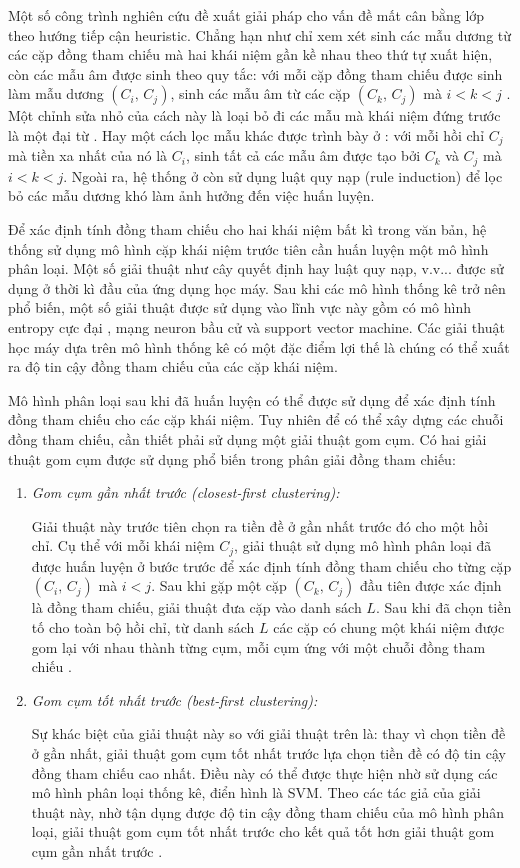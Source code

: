 Một số công trình nghiên cứu đề xuất giải pháp cho vấn đề mất cân bằng lớp theo hướng tiếp cận heuristic. Chẳng hạn như chỉ xem xét sinh các mẫu dương từ các cặp đồng tham chiếu mà hai khái niệm gần kề nhau theo thứ tự xuất hiện, còn các mẫu âm được sinh theo quy tắc: với mỗi cặp đồng tham chiếu được sinh làm mẫu dương $(C_i,\,C_j)$, sinh các mẫu âm từ các cặp $(C_k,\,C_j)$ mà $i<k<j$ \cite{Soon2001}. Một chỉnh sửa nhỏ của cách này là loại bỏ đi các mẫu mà khái niệm đứng trước là một đại từ \cite{VincentNg2002a}. Hay một cách lọc mẫu khác được trình bày ở \cite{VincentNg2002b}: với mỗi hồi chỉ $C_j$ mà tiền xa nhất của nó là $C_i$, sinh tất cả các mẫu âm được tạo bởi $C_k$ và $C_j$ mà $i<k<j$. Ngoài ra, hệ thống ở \cite{VincentNg2002b} còn sử dụng luật quy nạp (rule induction) để lọc bỏ các mẫu dương khó làm ảnh hưởng đến việc huấn luyện.

Để xác định tính đồng tham chiếu cho hai khái niệm bất kì trong văn bản, hệ thống sử dụng mô hình cặp khái niệm trước tiên cần huấn luyện một mô hình phân loại. Một số giải thuật như cây quyết định hay luật quy nạp, v.v... được sử dụng ở thời kì đầu của ứng dụng học máy. Sau khi các mô hình thống kê trở nên phổ biến, một số giải thuật được sử dụng vào lĩnh vực này gồm có mô hình entropy cực đại \cite{Berger1996}, mạng neuron bầu cử \cite{Freund1999} và support vector machine. Các giải thuật học máy dựa trên mô hình thống kê có một đặc điểm lợi thế là chúng có thể xuất ra độ tin cậy đồng tham chiếu của các cặp khái niệm. 

Mô hình phân loại sau khi đã huấn luyện có thể được sử dụng để xác định tính đồng tham chiếu cho các cặp khái niệm. Tuy nhiên để có thể xây dựng các chuỗi đồng tham chiếu, cần thiết phải sử dụng một giải thuật gom cụm. Có hai giải thuật gom cụm được sử dụng phổ biến trong phân giải đồng tham chiếu:

\begin{enumerate}
\item \emph{Gom cụm gần nhất trước (closest-first clustering):}

Giải thuật này trước tiên chọn ra tiền đề ở gần nhất trước đó cho một hồi chỉ. Cụ thể với mỗi khái niệm $C_j$, giải thuật sử dụng mô hình phân loại đã được huấn luyện ở bước trước để xác định tính đồng tham chiếu cho từng cặp $(C_i,\,C_j)$ mà $i<j$. Sau khi gặp một cặp $(C_k,\,C_j)$ đầu tiên được xác định là đồng tham chiếu, giải thuật đưa cặp vào danh sách $L$. Sau khi đã chọn tiền tố cho toàn bộ hồi chỉ, từ danh sách $L$ các cặp có chung một khái niệm được gom lại với nhau thành từng cụm, mỗi cụm ứng với một chuỗi đồng tham chiếu \cite{Soon2001}.
\item \emph{Gom cụm tốt nhất trước (best-first clustering):}

Sự khác biệt của giải thuật này so với giải thuật trên là: thay vì chọn tiền đề ở gần nhất, giải thuật gom cụm tốt nhất trước lựa chọn tiền đề có độ tin cậy đồng tham chiếu cao nhất. Điều này có thể được thực hiện nhờ sử dụng các mô hình phân loại thống kê, điển hình là SVM. Theo các tác giả của giải thuật này, nhờ tận dụng được độ tin cậy đồng tham chiếu của mô hình phân loại, giải thuật gom cụm tốt nhất trước cho kết quả tốt hơn giải thuật gom cụm gần nhất trước \cite{VincentNg2002a}.
\end{enumerate}

